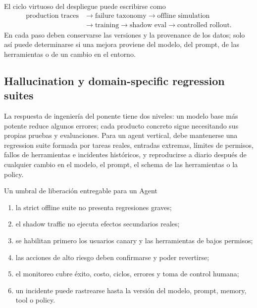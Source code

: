 \documentclass[a4paper]{article}
\begin{document}

El ciclo virtuoso del despliegue puede escribirse como
\[
\begin{aligned}
\text{production traces}&\rightarrow\text{failure taxonomy}
\rightarrow\text{offline simulation}\\
&\rightarrow\text{training}\rightarrow\text{shadow eval}
\rightarrow\text{controlled rollout}.
\end{aligned}
\]
En cada paso deben conservarse las versiones y la provenance de los datos; solo así puede determinarse si una mejora proviene del modelo, del prompt, de las herramientas o de un cambio en el entorno.

\subsection{Hallucination y domain-specific regression suites}

La respuesta de ingeniería del ponente tiene dos niveles: un modelo base más potente reduce algunos errores; cada producto concreto sigue necesitando sus propias pruebas y evaluaciones. Para un agent vertical, debe mantenerse una regression suite formada por tareas reales, entradas extremas, límites de permisos, fallos de herramientas e incidentes históricos, y reproducirse a diario después de cualquier cambio en el modelo, el prompt, el schema de las herramientas o la policy.


\begin{importantbox}{Un umbral de liberación entregable para un Agent}
\begin{enumerate}
  \item la strict offline suite no presenta regresiones graves;
  \item el shadow traffic no ejecuta efectos secundarios reales;
  \item se habilitan primero los usuarios canary y las herramientas de bajos permisos;
  \item las acciones de alto riesgo deben confirmarse y poder revertirse;
  \item el monitoreo cubre éxito, costo, ciclos, errores y toma de control humana;
  \item un incidente puede rastrearse hasta la versión del modelo, prompt, memory, tool o policy.
\end{enumerate}
\end{importantbox}
\end{document}
